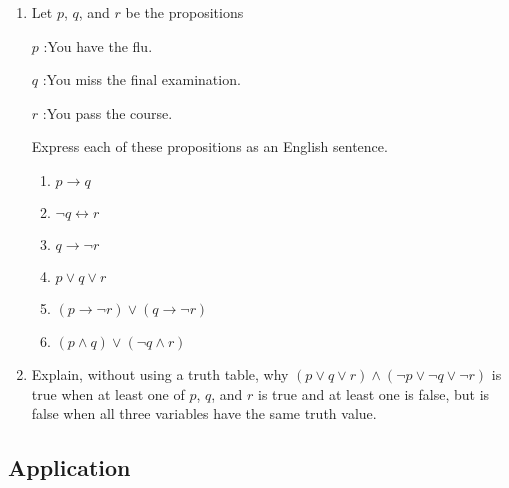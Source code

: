 \documentclass{sig-alternate-05-2015}
\begin{document}
\begin{enumerate}
\item Let $p$, $q$, and $r$ be the propositions

$p$ :You have the flu.

$q$ :You miss the final examination.

$r$ :You pass the course.

Express each of these propositions as an English sentence.
\begin{enumerate}
	\item $p\rightarrow q$
	\item $\neg q \leftrightarrow r$
	\item $q \rightarrow \neg r$
	\item $p \vee q \vee r$
	\item $(p \rightarrow \neg r ) \vee (q \rightarrow \neg r)$
	\item $(p\wedge q)\vee (\neg q \wedge r)$
\end{enumerate}

\item Explain, without using a truth table, why $(p \vee q \vee r) \wedge
(\neg p \vee \neg q \vee \neg r)$ is true when at least one of $p$, $q$, and $r$
is true and at least one is false, but is false when all three
variables have the same truth value.

\end{enumerate}

\subsection{Application}
\end{document}

